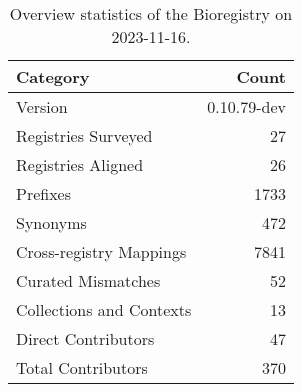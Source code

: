 \begin{table}
\caption{Overview statistics of the Bioregistry on 2023-11-16.}
\label{tab:bioregistry-summary}
\begin{tabular}{lr}
\toprule
Category & Count \\
\midrule
Version & 0.10.79-dev \\
Registries Surveyed & 27 \\
Registries Aligned & 26 \\
Prefixes & 1733 \\
Synonyms & 472 \\
Cross-registry Mappings & 7841 \\
Curated Mismatches & 52 \\
Collections and Contexts & 13 \\
Direct Contributors & 47 \\
Total Contributors & 370 \\
\bottomrule
\end{tabular}
\end{table}

